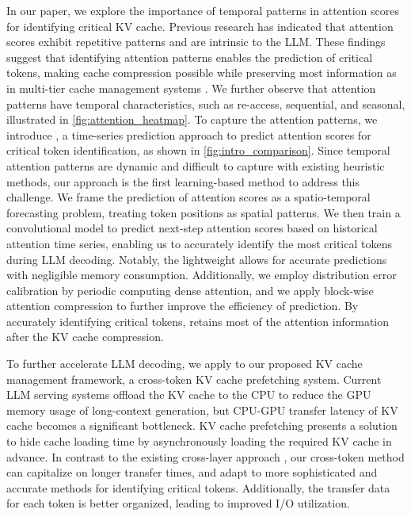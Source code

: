 In our paper, we explore the importance of temporal patterns in attention scores for identifying critical KV cache. Previous research has indicated that attention scores exhibit repetitive patterns \citep{jiang2024minference, ge2024fastgen} and are intrinsic to the LLM. 
These findings suggest that identifying attention patterns enables the prediction of critical tokens, making cache compression possible while preserving most information as in multi-tier cache management systems \citep{hashemi2018learning, li2021block}.
We further observe that attention patterns have temporal characteristics, such as re-access, sequential, and seasonal, illustrated in \autoref{fig:attention_heatmap}.
To capture the attention patterns, we introduce \ours, a time-series prediction approach to predict attention scores for critical token identification, as shown in \autoref{fig:intro_comparison}. 
Since temporal attention patterns are dynamic and difficult to capture with existing heuristic methods, our approach is the first learning-based method to address this challenge.
We frame the prediction of attention scores as a spatio-temporal forecasting problem, treating token positions as spatial patterns. 
We then train a convolutional model to predict next-step attention scores based on historical attention time series, enabling us to accurately identify the most critical tokens during LLM decoding.
Notably, the lightweight \ours allows for accurate predictions with negligible memory consumption.
Additionally, we employ distribution error calibration by periodic computing dense attention,
and we apply block-wise attention compression to further improve the efficiency of prediction. 
By accurately identifying critical tokens, \ours retains most of the attention information after the KV cache compression.

To further accelerate LLM decoding, we apply \ours to our proposed KV cache management framework, a cross-token KV cache prefetching system.
Current LLM serving systems offload the KV cache to the CPU to reduce the GPU memory usage of long-context generation, but CPU-GPU transfer latency of KV cache becomes a significant bottleneck.  
KV cache prefetching presents a solution to hide cache loading time by asynchronously loading the required KV cache in advance.
In contrast to the existing cross-layer approach \citep{lee2024infinigen}, our cross-token method can capitalize on longer transfer times, and adapt to more sophisticated and accurate methods for identifying critical tokens. 
Additionally, the transfer data for each token is better organized, leading to improved I/O utilization.


